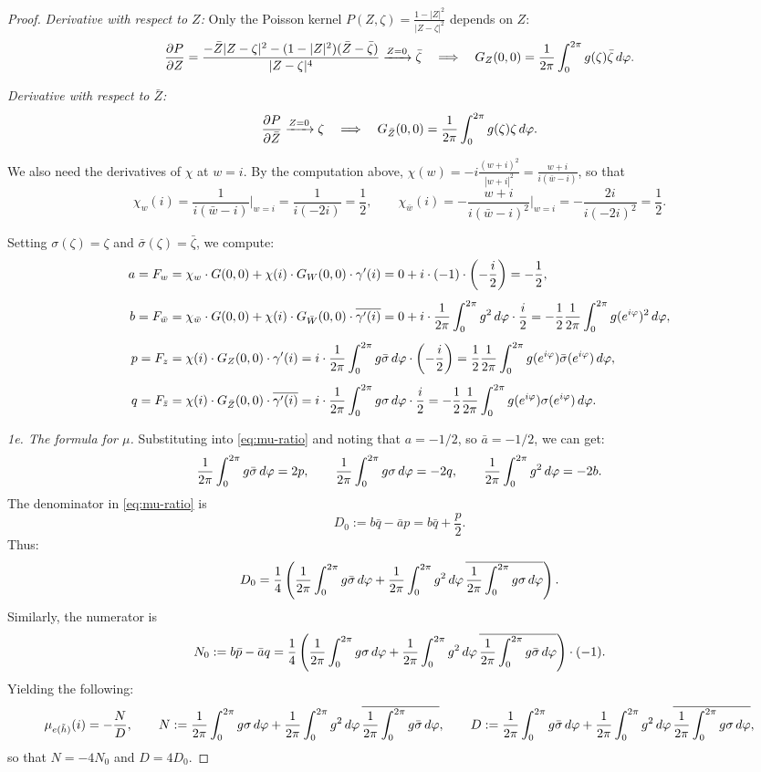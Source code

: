 \begin{proof}
	\textit{Derivative with respect to $Z$:} Only the Poisson kernel $P(Z,\zeta) = \frac{1-|Z|^2}{|Z-\zeta|^2}$ depends on $Z$:
	\[
	\frac{\partial P}{\partial Z} = \frac{-\bar{Z}|Z-\zeta|^2 - (1-|Z|^2)(\bar{Z}-\bar{\zeta})}{|Z-\zeta|^4} \xrightarrow{Z=0} \bar{\zeta} \quad\Longrightarrow\quad G_Z(0,0) = \frac{1}{2\pi}\int_0^{2\pi} g(\zeta)\bar{\zeta} \,d\varphi.
	\]
	
	\textit{Derivative with respect to $\bar{Z}$:}
	\[
	\frac{\partial P}{\partial \bar{Z}} \xrightarrow{Z=0} \zeta \quad\Longrightarrow\quad G_{\bar{Z}}(0,0) = \frac{1}{2\pi}\int_0^{2\pi} g(\zeta)\zeta \,d\varphi.
	\]
	
	We also need the derivatives of $\chi$ at $w = i$. By the computation above,
	$\chi(w)=-i\frac{(w+i)^2}{|w+i|^2}=\frac{w+i}{i(\bar{w}-i)}$, so that
	\[
	\chi_w(i) = \frac{1}{i(\bar{w}-i)}\bigg|_{w=i} = \frac{1}{i(-2i)} = \frac{1}{2}, \qquad \chi_{\bar{w}}(i) = -\frac{w+i}{i(\bar{w}-i)^2}\bigg|_{w=i} = -\frac{2i}{i(-2i)^2} = \frac{1}{2}.
	\]
	
	Setting $\sigma(\zeta) = \zeta$ and $\bar{\sigma}(\zeta) = \bar{\zeta}$, we compute:
	\begin{align*}
		a = F_w &= \chi_w \cdot G(0,0) + \chi(i) \cdot G_W(0,0) \cdot \gamma'(i) = 0 + i \cdot (-1) \cdot \left(-\frac{i}{2}\right) = -\frac{1}{2},\\[4pt]
		b = F_{\bar{w}} &= \chi_{\bar{w}} \cdot G(0,0) + \chi(i) \cdot G_{\bar{W}}(0,0) \cdot \overline{\gamma'(i)} = 0 + i \cdot \frac{1}{2\pi}\int_0^{2\pi} g^2 \,d\varphi \cdot \frac{i}{2} = -\frac{1}{2}\frac{1}{2\pi}\int_0^{2\pi} g(e^{i\varphi})^2 \,d\varphi,\\[4pt]
		p = F_z &= \chi(i) \cdot G_Z(0,0) \cdot \gamma'(i) = i \cdot \frac{1}{2\pi}\int_0^{2\pi} g\bar{\sigma} \,d\varphi \cdot \left(-\frac{i}{2}\right) = \frac{1}{2}\frac{1}{2\pi}\int_0^{2\pi} g(e^{i\varphi})\bar{\sigma}(e^{i\varphi}) \,d\varphi,\\[4pt]
		q = F_{\bar{z}} &= \chi(i) \cdot G_{\bar{Z}}(0,0) \cdot \overline{\gamma'(i)} = i \cdot \frac{1}{2\pi}\int_0^{2\pi} g\sigma \,d\varphi \cdot \frac{i}{2} = -\frac{1}{2}\frac{1}{2\pi}\int_0^{2\pi} g(e^{i\varphi})\sigma(e^{i\varphi}) \,d\varphi.
	\end{align*}
	
	\medskip
	\noindent\textit{1e. The formula for $\mu$.}
	Substituting into \eqref{eq:mu-ratio} and noting that $a = -1/2$, so $\bar{a} = -1/2$, we can get:
	\[
	\frac{1}{2\pi}\int_0^{2\pi} g\bar{\sigma} \,d\varphi = 2p, \qquad \frac{1}{2\pi}\int_0^{2\pi} g\sigma \,d\varphi = -2q, \qquad \frac{1}{2\pi}\int_0^{2\pi} g^2 \,d\varphi = -2b.
	\]
	The denominator in \eqref{eq:mu-ratio} is
	\[
	D_0 := b\bar{q} - \bar{a}p = b\bar{q} + \frac{p}{2}.
	\]
	Thus:
	\[
	D_0 = \frac{1}{4}\left(\frac{1}{2\pi}\int_0^{2\pi} g\bar{\sigma} \,d\varphi + \frac{1}{2\pi}\int_0^{2\pi} g^2 \,d\varphi\,\overline{\frac{1}{2\pi}\int_0^{2\pi} g\sigma \,d\varphi}\right).
	\]
	Similarly, the numerator is
	\[
	N_0 := b\bar{p} - \bar{a}q = \frac{1}{4}\left(\frac{1}{2\pi}\int_0^{2\pi} g\sigma \,d\varphi + \frac{1}{2\pi}\int_0^{2\pi} g^2 \,d\varphi\,\overline{\frac{1}{2\pi}\int_0^{2\pi} g\bar{\sigma} \,d\varphi}\right) \cdot (-1).
	\]
	Yielding the following:
	\begin{equation}\label{eq:mu-formula}
		\mu_{e(\tilde{h})}(i) = -\frac{N}{D},\qquad
		N:=\frac{1}{2\pi}\int_0^{2\pi} g\sigma \,d\varphi+\frac{1}{2\pi}\int_0^{2\pi} g^2 \,d\varphi\,\overline{\frac{1}{2\pi}\int_0^{2\pi} g\bar{\sigma} \,d\varphi},\qquad
		D:=\frac{1}{2\pi}\int_0^{2\pi} g\bar{\sigma} \,d\varphi+\frac{1}{2\pi}\int_0^{2\pi} g^2 \,d\varphi\,\overline{\frac{1}{2\pi}\int_0^{2\pi} g\sigma \,d\varphi} ,
	\end{equation}
	so that $N=-4N_0$ and $D=4D_0$.
	

\end{proof}
